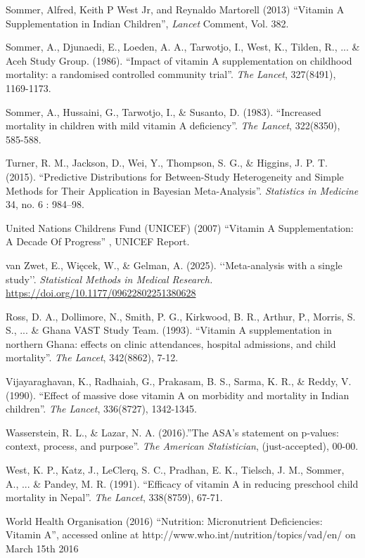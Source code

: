 \documentclass[12pt]{article}
\begin{document}
\begin{thebibliography}{99}
 Sommer, Alfred, Keith P West Jr, and Reynaldo Martorell (2013) ``Vitamin A Supplementation in Indian Children'', \emph{Lancet} Comment, Vol. 382.

 Sommer, A., Djunaedi, E., Loeden, A. A., Tarwotjo, I., West, K., Tilden, R., ... \& Aceh Study Group. (1986). ``Impact of vitamin A supplementation on childhood mortality: a randomised controlled community trial''. \emph{The Lancet}, 327(8491), 1169-1173.

 Sommer, A., Hussaini, G., Tarwotjo, I., \& Susanto, D. (1983). ``Increased mortality in children with mild vitamin A deficiency''. \emph{The Lancet}, 322(8350), 585-588.

 Turner, R. M., Jackson, D., Wei, Y., Thompson, S. G., \& Higgins, J. P. T. (2015). ``Predictive Distributions for Between-Study Heterogeneity and Simple Methods for Their Application in Bayesian Meta-Analysis''. \emph{Statistics in Medicine} 34, no. 6 : 984–98.

 United Nations Childrens Fund (UNICEF) (2007) ``Vitamin A Supplementation: A Decade Of Progress'' , UNICEF Report. 

van Zwet, E., Więcek, W., \& Gelman, A. (2025). ‘‘Meta-analysis with a single study’’. \emph{Statistical Methods in Medical Research.} \url{https://doi.org/10.1177/09622802251380628}

 Ross, D. A., Dollimore, N., Smith, P. G., Kirkwood, B. R., Arthur, P., Morris, S. S., ... \& Ghana VAST Study Team. (1993). ``Vitamin A supplementation in northern Ghana: effects on clinic attendances, hospital admissions, and child mortality''. \emph{The Lancet}, 342(8862), 7-12.

 Vijayaraghavan, K., Radhaiah, G., Prakasam, B. S., Sarma, K. R., \& Reddy, V. (1990). ``Effect of massive dose vitamin A on morbidity and mortality in Indian children''. \emph{The Lancet}, 336(8727), 1342-1345.

 Wasserstein, R. L., \& Lazar, N. A. (2016).''The ASA's statement on p-values: context, process, and purpose''. \emph{The American Statistician}, (just-accepted), 00-00.

 West, K. P., Katz, J., LeClerq, S. C., Pradhan, E. K., Tielsch, J. M., Sommer, A., ... \& Pandey, M. R. (1991). ``Efficacy of vitamin A in reducing preschool child mortality in Nepal''. \emph{The Lancet}, 338(8759), 67-71.

 World Health Organisation (2016) ``Nutrition: Micronutrient Deficiencies: Vitamin A'', accessed online at http://www.who.int/nutrition/topics/vad/en/ on March 15th 2016


\end{thebibliography}
\end{document}
